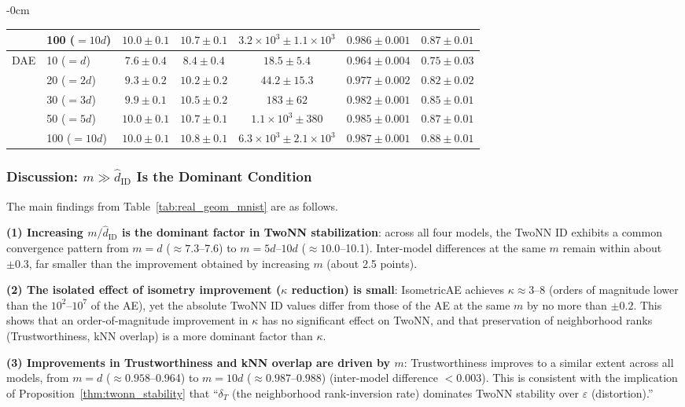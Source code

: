 \documentclass[make,article,submit,pdftex,moreauthors]{Definitions/mdpi}
\newcommand{\kap}{\kappa}
\begin{document}
\begin{table}[H]
\begin{adjustwidth}{-\extralength}{0cm}
\begin{tabular}{llccccc}
 & 100 ($=10d$) & $10.0\pm0.1$ & $10.7\pm0.1$ & $3.2\times10^3\pm 1.1\times10^3$ & $0.986\pm0.001$ & $0.87\pm0.01$ \\
\midrule
\multirow{5}{*}{DAE}
 & 10 ($=d$)    & $7.6\pm0.4$ & $8.4\pm0.4$ & $18.5\pm5.4$ & $0.964\pm0.004$ & $0.75\pm0.03$ \\
 & 20 ($=2d$)   & $9.3\pm0.2$ & $10.2\pm0.2$ & $44.2\pm15.3$ & $0.977\pm0.002$ & $0.82\pm0.02$ \\
 & 30 ($=3d$)   & $9.9\pm0.1$ & $10.5\pm0.2$ & $183\pm62$ & $0.982\pm0.001$ & $0.85\pm0.01$ \\
 & 50 ($=5d$)   & $10.0\pm0.1$ & $10.7\pm0.1$ & $1.1\times10^3\pm 380$ & $0.985\pm0.001$ & $0.87\pm0.01$ \\
 & 100 ($=10d$) & $10.0\pm0.1$ & $10.8\pm0.1$ & $6.3\times10^3\pm 2.1\times10^3$ & $0.987\pm0.001$ & $0.88\pm0.01$ \\
\bottomrule
\end{tabular}
\end{adjustwidth}
\end{table}

\subsubsection*{Discussion: $m \gg \hat{d}_\mathrm{ID}$ Is the Dominant Condition}

The main findings from Table~\ref{tab:real_geom_mnist} are as follows.

\textbf{(1) Increasing $m/\hat{d}_\mathrm{ID}$ is the dominant factor in TwoNN stabilization}:
across all four models, the TwoNN ID exhibits a common convergence pattern
from $m=d$ ($\approx 7.3$--7.6) to $m=5d$--$10d$ ($\approx 10.0$--10.1).
Inter-model differences at the same $m$ remain within about $\pm0.3$, far
smaller than the improvement obtained by increasing $m$ (about 2.5 points).

\textbf{(2) The isolated effect of isometry improvement ($\kap$ reduction) is small}:
IsometricAE achieves $\kap \approx 3$--8 (orders of magnitude lower than the
$10^2$--$10^7$ of the AE), yet the absolute TwoNN ID values differ from those
of the AE at the same $m$ by no more than $\pm 0.2$.
This shows that an order-of-magnitude improvement in $\kap$ has no significant
effect on TwoNN, and that preservation of neighborhood ranks (Trustworthiness,
kNN overlap) is a more dominant factor than $\kap$.

\textbf{(3) Improvements in Trustworthiness and kNN overlap are driven by $m$}:
Trustworthiness improves to a similar extent across all models, from $m=d$
($\approx 0.958$--0.964) to $m=10d$ ($\approx 0.987$--0.988) (inter-model
difference $< 0.003$).
This is consistent with the implication of
Proposition~\ref{thm:twonn_stability} that ``$\delta_T$ (the neighborhood
rank-inversion rate) dominates TwoNN stability over $\varepsilon$
(distortion).''
\end{document}
